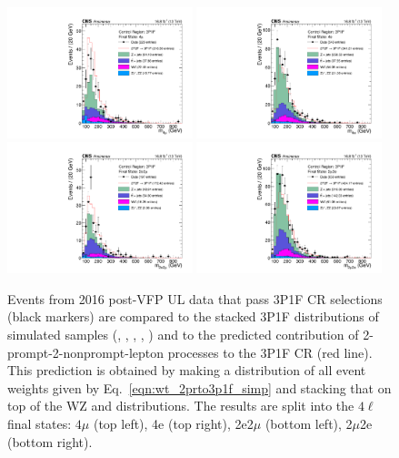 \begin{figure}[!htbp]
	\begin{center}
		\includegraphics[width=0.48\textwidth]{figures/higgsmassmeas/redbkg/cr/UL2016postVFP_CR_3P1F_4mu.pdf}
		\includegraphics[width=0.48\textwidth]{figures/higgsmassmeas/redbkg/cr/UL2016postVFP_CR_3P1F_4e.pdf}
		\includegraphics[width=0.48\textwidth]{figures/higgsmassmeas/redbkg/cr/UL2016postVFP_CR_3P1F_2e2mu.pdf}
		\includegraphics[width=0.48\textwidth]{figures/higgsmassmeas/redbkg/cr/UL2016postVFP_CR_3P1F_2mu2e.pdf}
		\caption{
			Events from 2016 post-VFP UL data that pass 3P1F CR selections (black markers) 
			are compared to the stacked 3P1F distributions of simulated samples
			(\Zplusjets, \ttbarplusjets, \WZ, \ZZ, \Zgammastar)
			and to the predicted contribution of 2-prompt-2-nonprompt-lepton processes to the 3P1F CR (red line).
			This prediction is obtained by making a distribution of all event weights given by Eq.~\ref{eqn:wt_2prto3p1f_simp} and stacking that on top of the WZ and \ZZ distributions.
			The results are split into the $4\ell$ final states:
			$4\mu$ (top left), 4e (top right), 2e2$\mu$ (bottom left), 2$\mu$2e (bottom right).
		}
		\label{cr_plots_3p1f_2016postvfp}
	\end{center}
\end{figure}
